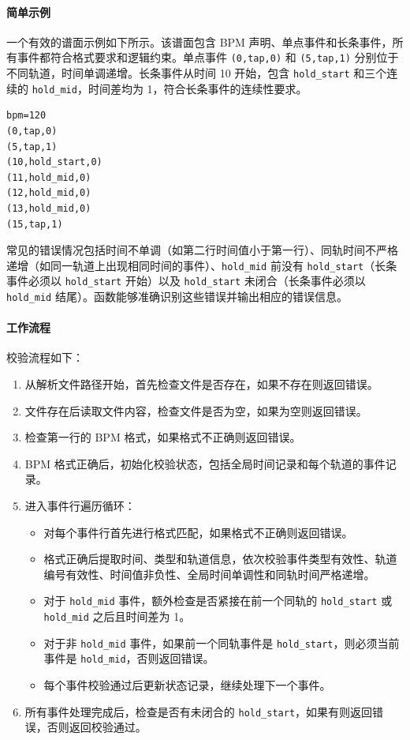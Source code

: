 \documentclass[12pt, a4paper]{article}
\begin{document}
\paragraph{简单示例}
一个有效的谱面示例如下所示。该谱面包含 BPM 声明、单点事件和长条事件，所有事件都符合格式要求和逻辑约束。单点事件 \texttt{(0,tap,0)} 和 \texttt{(5,tap,1)} 分别位于不同轨道，时间单调递增。长条事件从时间 10 开始，包含 \texttt{hold\_start} 和三个连续的 \texttt{hold\_mid}，时间差均为 1，符合长条事件的连续性要求。

\begin{verbatim}
bpm=120
(0,tap,0)
(5,tap,1)
(10,hold_start,0)
(11,hold_mid,0)
(12,hold_mid,0)
(13,hold_mid,0)
(15,tap,1)
\end{verbatim}

常见的错误情况包括时间不单调（如第二行时间值小于第一行）、同轨时间不严格递增（如同一轨道上出现相同时间的事件）、\texttt{hold\_mid} 前没有 \texttt{hold\_start}（长条事件必须以 \texttt{hold\_start} 开始）以及 \texttt{hold\_start} 未闭合（长条事件必须以 \texttt{hold\_mid} 结尾）。函数能够准确识别这些错误并输出相应的错误信息。

\paragraph{工作流程}
校验流程如下：
\begin{enumerate}
    \item 从解析文件路径开始，首先检查文件是否存在，如果不存在则返回错误。
    \item 文件存在后读取文件内容，检查文件是否为空，如果为空则返回错误。
    \item 检查第一行的 BPM 格式，如果格式不正确则返回错误。
    \item BPM 格式正确后，初始化校验状态，包括全局时间记录和每个轨道的事件记录。
    \item 进入事件行遍历循环：
    \begin{itemize}
        \item 对每个事件行首先进行格式匹配，如果格式不正确则返回错误。
        \item 格式正确后提取时间、类型和轨道信息，依次校验事件类型有效性、轨道编号有效性、时间值非负性、全局时间单调性和同轨时间严格递增。
        \item 对于 \texttt{hold\_mid} 事件，额外检查是否紧接在前一个同轨的 \texttt{hold\_start} 或 \texttt{hold\_mid} 之后且时间差为 1。
        \item 对于非 \texttt{hold\_mid} 事件，如果前一个同轨事件是 \texttt{hold\_start}，则必须当前事件是 \texttt{hold\_mid}，否则返回错误。
        \item 每个事件校验通过后更新状态记录，继续处理下一个事件。
    \end{itemize}
    \item 所有事件处理完成后，检查是否有未闭合的 \texttt{hold\_start}，如果有则返回错误，否则返回校验通过。
\end{enumerate}
\end{document}
